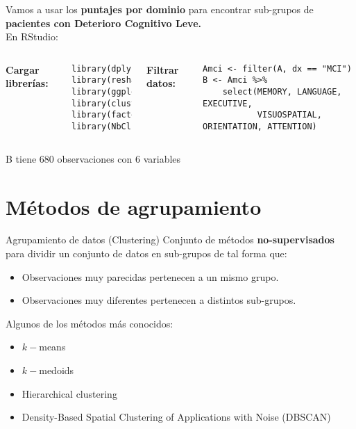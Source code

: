 \documentclass[10pt, aspectratio=169]{beamer}
\begin{document}
\begin{frame}[fragile]{}
 Vamos a usar los \textbf{puntajes por dominio} para encontrar sub-grupos de \textbf{pacientes con Deterioro Cognitivo Leve.}\\
 \vspace{0.4cm}
 \pause
 En RStudio:\\
 \vspace{0.3cm}
 \begin{columns}[t]
 \pause
 \textcolor{UltraViolet}{\textbf{Cargar librerías:}}\\
 \vspace{-0.2cm}
 \begin{verbatim}
library(dplyr)
library(reshape2)
library(ggplot2)
library(cluster)
library(factoextra)
library(NbClust)
 \end{verbatim}
 \pause
 \textcolor{UltraViolet}{\textbf{Filtrar datos:}}\\
 \vspace{-0.2cm}
 \begin{verbatim}
Amci <- filter(A, dx == "MCI")
B <- Amci %>%
    select(MEMORY, LANGUAGE, EXECUTIVE, 
           VISUOSPATIAL, ORIENTATION, ATTENTION)
 \end{verbatim}
 \end{columns}
 B tiene 680 observaciones con 6 variables
\end{frame}

\section{Métodos de agrupamiento}

\begin{frame}[fragile]{Agrupamiento de datos (Clustering)}
Conjunto de métodos \textbf{no-supervisados} para dividir un conjunto de datos en sub-grupos de tal forma que:
\begin{itemize}
 \item Observaciones muy parecidas pertenecen a un mismo grupo.
 \item Observaciones muy diferentes pertenecen a distintos sub-grupos.
\end{itemize}
\vspace{0.4cm}
\pause
Algunos de los métodos más conocidos:
 \begin{itemize}
  \item \textcolor<3>{PinkPeacock}{$k-$means} 
  \item $k-$medoids
  \item Hierarchical clustering
  \item Density-Based Spatial Clustering of Applications with Noise (DBSCAN) 
 \end{itemize}
\end{frame}
\end{document}
